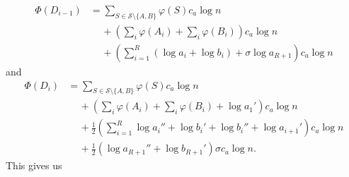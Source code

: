 \documentclass[11pt]{article}
\newcommand{\cons}[1]{\ensuremath{c_{#1}}}
\newcommand{\cnsa}{\cons a}
\newcommand{\isodd}{\ensuremath{\sigma}}
\newcommand{\intl}[1]{\ensuremath{#1}}
\newcommand{\set}[1]{\ensuremath{#1}}
\newcommand{\collection}[1]{\ensuremath{\mathcal #1}}
\newcommand{\agap}[1]{\ensuremath{a_{#1}}}
\newcommand{\leftofa}[1]{\ensuremath{a_{#1}'}}
\newcommand{\rightofa}[1]{\ensuremath{a_{#1}''}}
\newcommand{\bgap}[1]{\ensuremath{b_{#1}}}
\newcommand{\leftofb}[1]{\ensuremath{b_{#1}'}}
\newcommand{\rightofb}[1]{\ensuremath{b_{#1}''}}
\newcommand{\datast}[1]{\ensuremath{D_{#1}}}
\newcommand{\potfun}[1]{\ensuremath{\Phi(#1)}}
\begin{document}
\begin{align*} 
\potfun{\datast{i-1}} &= \sum_{S\in \collection S \setminus\{\set A, \set B\}} \varphi(S)\cnsa\log n\\ 
& \quad\, +\left(\sum_i \varphi(\intl A_i) +\sum_i \varphi(\intl B_i)\right)\cnsa\log n  \\ 
& \quad\, +\left(\sum_{i=1}^R (\log \agap i + \log \bgap i) + \isodd\log \agap{R+1}\right)\cnsa\log n 
\end{align*} 
and 
\begin{align*} 
\potfun{\datast i} &= \sum_{S\in \collection S \setminus\{\set A, \set B\}} \varphi(S)\cnsa\log n\\ 
& \quad\, +\left(\sum_i \varphi(\intl A_i) +\sum_i \varphi(\intl B_i) + \log \leftofa{1}\right)\cnsa\log n  \\ 
& \quad\, +\frac{1}{2}\left(\sum_{i=1}^R \log \rightofa{ i} + \log \leftofb{i} + \log \rightofb{ i} + \log \leftofa{i+1}\right)\cnsa\log n\\ 
& \quad\, + \frac{1}{2}\left(\log \rightofa{{R+1}} + \log \leftofb{R+1}\right)\isodd \cnsa\log n. 
\end{align*} 
This gives us 
\end{document}

